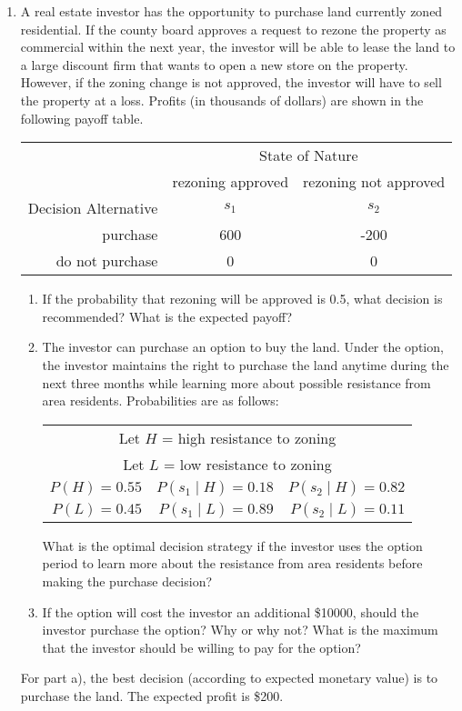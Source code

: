 \begin{enumerate}
\item A real estate investor has the opportunity to purchase land currently
zoned residential. If the county board approves a request to rezone the property
as commercial within the next year, the investor will be able to lease the
land to a large discount firm that wants to open a new store on the property.
However, if the zoning change is not approved, the investor will have to sell
the property at a loss. Profits (in thousands of dollars) are shown in the 
following payoff table.

\begin{tabular}{rcc}
& \multicolumn{2}{c}{State of Nature} \\
& rezoning approved & rezoning not approved \\
Decision Alternative & $s_1$ & $s_2$ \\
purchase & 600 & -200\\
do not purchase & 0 & 0
\end{tabular}

\begin{enumerate}
    \item If the probability that rezoning will be approved is 0.5, what
    decision is recommended? What is the expected payoff?
    \item The investor can purchase an option to buy the land. Under the option,
    the investor maintains the right to purchase the land anytime during the next
    three months while learning more about possible resistance from area residents.
    Probabilities are as follows:
    
    \begin{tabular}{rrr}
    \multicolumn{3}{c}{Let $H$ = high resistance to zoning}\\
    \multicolumn{3}{c}{Let $L$ = low resistance to zoning}\\
    $P(H)=0.55$ & $P(s_1 \mid H)=0.18$ & $P(s_2 \mid H)=0.82$ \\
    $P(L)=0.45$ & $P(s_1 \mid L)=0.89$ & $P(s_2 \mid L)=0.11$ 
    \end{tabular}
    
    What is the optimal decision strategy if the investor uses the option
    period to learn more about the resistance from area residents before making
    the purchase decision?
    \item If the option will cost the investor an additional \$\num{10000}, 
    should the investor purchase the option? Why or why not? What is the maximum
    that the investor should be willing to pay for the option?
\end{enumerate}
\begin{solution}
\bs For part a), the best decision (according to expected monetary value)
is to purchase the land. The expected profit is \$200.


\end{solution}
\end{enumerate}
